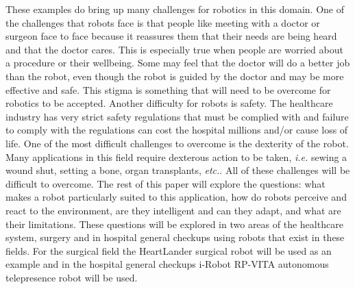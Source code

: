 \documentclass[11pt,conference]{IEEEtran}
\begin{document}
\newline
\indent These examples do bring up many challenges for robotics in this domain. One of the challenges that robots face is that people like meeting with a doctor or surgeon face to face because it reassures them that their needs are being heard and that the doctor cares.  This is especially true when people are worried about a procedure or their wellbeing.  Some may feel that the doctor will do a better job than the robot, even though the robot is guided by the doctor and may be more effective and safe.  This stigma is something that will need to be 
overcome for robotics to be accepted.  Another difficulty for robots is safety.  The healthcare industry has very strict safety regulations that must be complied with and failure to comply with the regulations can cost the hospital millions and/or cause loss of life.  One of the most difficult challenges to overcome is the dexterity of the robot.  Many applications in this field require dexterous action to be taken, \textit{i.e.} sewing a wound shut, setting a bone, organ transplants, \textit{etc.}.  All of these challenges will be difficult to overcome. 
\newline
\indent The rest of this paper will explore the questions: what makes a robot particularly suited to this application, how do robots perceive and react to the environment, are they intelligent and can they adapt, and what are their limitations.  These questions will be explored in two areas of the healthcare system, surgery and in hospital general checkups using robots that exist in these fields.  For the surgical field the HeartLander surgical robot will be used as an example and in the hospital general checkups i-Robot RP-VITA autonomous telepresence robot will be used. 
\end{document}
